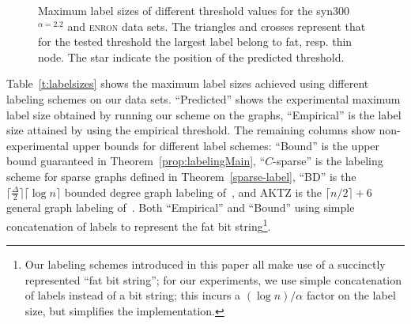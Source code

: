 \documentclass{article}
\theoremstyle{remark}
\begin{document}
\begin{figure}[!ht]
\centering
{}\hspace*{-2.5em}
\caption{Maximum label sizes of different threshold values for the   syn300$^{\alpha=2.2}$ and \textsc{enron} data sets.
The triangles and crosses represent that for the tested threshold the largest label belong to fat, resp. thin node. The star indicate the position of the predicted threshold.}
\label{fig:findings}\end{figure}

Table~\ref{t:labelsizes}  shows
 the maximum label sizes achieved using different labeling schemes on our data sets. ``Predicted'' shows the experimental maximum label size obtained by running our scheme on the graphs, ``Empirical'' is the label size attained by using the empirical threshold. The remaining columns show non-experimental upper bounds for different label schemes: ``Bound'' is the upper bound guaranteed in Theorem~\ref{prop:labelingMain}, ``$C$-sparse'' is  the labeling scheme for sparse graphs defined in Theorem~\ref{sparse-label}, ``BD'' is the $\lceil \frac{\Delta}{2} \rceil \lceil \log n\rceil$ bounded degree graph  labeling of~\cite{adjiashvili2014labeling}, and AKTZ is the $\lceil n/2\rceil+6$ general graph  labeling of~\cite{alstrup2014adjacency}.
Both ``Empirical'' and  ``Bound'' using simple concatenation of labels to represent the fat bit string\footnote{Our labeling schemes introduced in this paper all make use of a succinctly represented ``fat bit string''; for our experiments, we use simple concatenation of labels instead of a bit string; this incurs a $(\log n)/\alpha$ factor on the label size, but simplifies the implementation.}.
 
\end{document}
